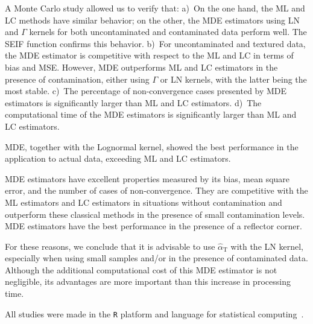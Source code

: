 \documentclass[twocolumn]{svjour3}
\begin{document}
	A Monte Carlo study allowed us to verify that:
	a)~On the one hand, the ML and LC methods have similar behavior; on the other, the MDE estimators using LN and $\Gamma$ kernels for both uncontaminated and contaminated data perform well. 
	The SEIF function confirms this behavior.
	b)~For uncontaminated and textured data, the MDE estimator is competitive with respect to the ML and LC in terms of bias and MSE. 
	However, MDE outperforms ML and LC estimators in the presence of contamination, either using $\Gamma$ or LN kernels, with the latter being the most stable.
	c)~The percentage of non-convergence cases presented by MDE estimators is significantly larger than ML and LC estimators.
	d)~The computational time of the MDE estimators is significantly larger than ML and LC estimators.
	
	MDE, together with the Lognormal kernel, showed the best performance in the application to actual data, exceeding ML and LC estimators. 
	
	MDE estimators have excellent properties measured by its bias, mean square error, and the number of cases of non-convergence. 
	They are competitive with the ML estimators and LC estimators in situations without contamination and outperform these classical methods in the presence of small contamination levels. 
	MDE estimators have the best performance in the presence of a reflector corner.
	
	For these reasons, we conclude that it is advisable to use $\widehat{\alpha}_{\text{T}}$ with the LN kernel, especially when using small samples and/or in the presence of contaminated data. 
	Although the additional computational cost of this MDE estimator is not negligible, its advantages are more important than this increase in processing time.
	
	All studies were made in the \texttt R platform and language for statistical computing~\cite{RLanguage}.
	
	
	
	
\end{document}
